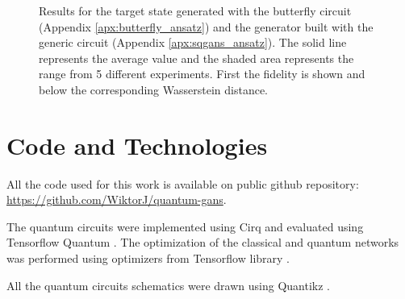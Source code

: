 \begin{figure}[htbp!]
  \caption{Results for the target state generated with the butterfly circuit (Appendix \ref{apx:butterfly_ansatz})
    and the generator built with the generic circuit (Appendix \ref{apx:sqgans_ansatz}).
    The solid line represents the average value and the shaded area
    represents the range from 5 different experiments. First the
    fidelity is shown and below the corresponding Wasserstein distance.}
  \label{fig:wqgans_res_butterfly_3}
\end{figure}
\let\clearpage\oldclearpage
\chapter{Code and Technologies}
All the code used for this work is available on public github repository:
\url{https://github.com/WiktorJ/quantum-gans}.

The quantum circuits were implemented using Cirq
\cite{https://doi.org/10.5281/zenodo.5138274} and evaluated using Tensorflow
Quantum \cite{broughton2020tensorflow}. The optimization of the classical and
quantum networks was performed using optimizers from Tensorflow library \cite{tensorflow2015-whitepaper}.

All the quantum circuits schematics were drawn using Quantikz \cite{https://doi.org/10.17637/rh.7000520}.



